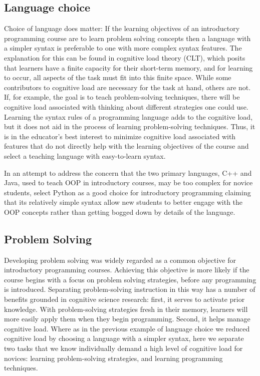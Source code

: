 \documentclass[12pt]{article}
\begin{document}
\subsection{Language choice}
Choice of language does matter: If the learning objectives of an
introductory programming course are to learn problem solving concepts
then a language with a simpler syntax is preferable to one with more
complex syntax features\autocite{koulouri_teaching_2014}. The
explanation for this can be found in cognitive load theory (CLT),
which posits that learners have a finite capacity for their short-term
memory, and for learning to occur, all aspects of the task must fit
into this finite space. While some contributors to cognitive load are
necessary for the task at hand, others are
not\autocite{paas_cognitive_2003}. If, for example, the goal is to
teach problem-solving techniques, there will be cognitive load
associated with thinking about different strategies one could
use. Learning the syntax rules of a programming language adds to the
cognitive load, but it does not aid in the process of learning
problem-solving techniques. Thus, it is in the educator's best
interest to minimize cognitive load associated with features that do
not directly help with the learning objectives of the course and
select a teaching language with easy-to-learn syntax.

In an attempt to address the concern that the two primary languages,
C++ and Java, used to teach OOP in introductory courses, may be too
complex for novice students, \citeauthor{goldwasser_teaching_2008}
select Python as a good choice for introductory programming claiming
that its relatively simple syntax allow new students to better engage
with the OOP concepts rather than getting bogged down by details of
the language\autocite{goldwasser_teaching_2008}.

\subsection{Problem Solving}
Developing problem solving was widely regarded as a common objective
for introductory programming courses. Achieving this objective is more
likely if the course begins with a focus on problem solving
strategies, before any programming is
introduced\autocite{koulouri_teaching_2014}. Separating
problem-solving instruction in this way has a number of benefits
grounded in cognitive science research: first, it serves to activate
prior knowledge\autocite{ambrose_how_2010}. With problem-solving
strategies fresh in their memory, learners will more easily apply them
when they begin programming. Second, it helps manage cognitive
load. Where as in the previous example of language choice we reduced
cognitive load by choosing a language with a simpler syntax, here we
separate two tasks that we know individually demand a high level of
cognitive load for novices: learning problem-solving strategies, and
learning programming techniques.
\end{document}
